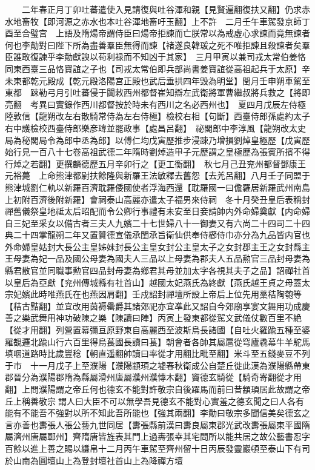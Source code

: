 　　二年春正月丁卯吐蕃遣使入見請復與吐谷渾和親【見賢遍翻復扶又翻】仍求赤水地畜牧【即河源之赤水也本吐谷渾地畜吁玉翻】上不許　二月壬午車駕發京師丁酉至合璧宫　上語及隋煬帝謂侍臣曰煬帝拒諫而亡朕常以為戒虛心求諫而竟無諫者何也李勣對曰陛下所為盡善羣臣無得而諫【禇遂良韓瑗之死不唯拒諫且殺諫者矣羣臣誰敢復諫乎李勣獻諛以苟利禄而不知凶于其家】　三月甲寅以兼司戎太常伯姜恪同東西臺三品恪寶誼之子也【司戎太常伯即兵部尚書姜寶誼從高祖起兵于太原】辛未東都乾元殿成【乾元殿洛陽宫正殿也武后垂拱四年毁為明堂】閏月壬申朔車駕至東都　踈勒弓月引吐蕃侵于闐敕西州都督崔知辯左武衛將軍曹繼叔將兵救之【將即亮翻　考異曰實錄作西川都督按於時未有西川之名必西州也】　夏四月戊辰左侍極陸敦信【龍朔改左右散騎常侍為左右侍極】檢校右相【句斷】西臺侍郎孫處約太子右中護檢校西臺侍郎樂彦瑋並罷政事【處昌呂翻】　祕閣郎中李淳風【龍朔改太史局為秘閣局令為郎中丞為郎】以傅仁均戊寅歷推步浸踈乃增損劉焯皇極歷【戊寅歷始行見一百八十七卷高祖武德二年隋時劉焯造甲子元歷謂之皇極歷為張賓所擯不得行焯之若翻】更撰麟德歷五月辛卯行之【更工衡翻】　秋七月己丑兖州都督鄧康王元裕薨　上命熊津都尉扶餘隆與新羅王法敏釋去舊怨【去羌呂翻】八月壬子同盟于熊津城劉仁軌以新羅百濟耽羅倭國使者浮海西還【耽羅國一曰儋羅居新羅武州南島上初附百濟後附新羅】會祠泰山高麗亦遣太子福男來侍祠　冬十月癸丑皇后表稱封禪舊儀祭皇地祗太后昭配而令公卿行事禮有未安至日妾請帥内外命婦奠獻【内命婦自三妃至采女以備古者三夫人九嬪二十七世婦八十一御妻又有六尚二十四司二十四典二十四掌龍朔二年又置贊德宣儀承閨承旨衛仙供奉侍櫛侍巾亦分為九品皆内官也外命婦皇姑封大長公主皇姊妹封長公主皇女封公主皇太子之女封郡主王之女封縣主王母妻為妃一品及國公母妻為國夫人三品以上母妻為郡夫人五品勲官三品封母妻為縣君散官並同職事勲官四品封母妻為鄉君其母並加太字各視其夫子之品】詔禪社首以皇后為亞獻【兖州傳城縣有社首山】越國太妃燕氏為終獻【燕氏越王貞之母蓋太宗妃嬪此時唯燕氏在也燕因肩翻】壬戍詔封禪壇所設上帝后上位先用藳秸陶匏等【秸古黠翻】並宜改用茵褥罍爵其諸郊祀亦宜凖此又詔自今郊廟享宴文舞用功成慶善之樂武舞用神功破陳之樂【陳讀曰陣】丙寅上發東都從駕文武儀仗數百里不絶【從才用翻】列營置幕彌亘原野東自高麗西至波斯烏長諸國【自吐火羅踰五種至婆羅覩邏北踰山行六百里得烏萇國長讀曰萇】朝會者各帥其屬扈從穹廬毳幕牛羊駝馬填咽道路時比歲豐稔【朝直遥翻帥讀曰率從才用翻比毗至翻】米斗至五錢麥豆不列于市　十一月戊子上至濮陽【濮陽顓頊之墟春秋衛成公自楚丘徙此漢為濮陽縣帶東郡晉分為濮陽郡隋為縣屬滑州唐屬濮州濮慱木翻】竇德玄騎從【騎奇寄翻從才用翻】上問濮陽謂之帝丘何也德玄不能對許敬宗自後躍馬而前曰昔顓頊居此故謂之帝丘上稱善敬宗謂人曰大臣不可以無學吾見德玄不能對心實羞之德玄聞之曰人各有能有不能吾不強對以所不知此吾所能也【強其兩翻】李勣曰敬宗多聞信美矣德玄之言亦善也夀張人張公藝九世同居【夀張縣前漢曰夀良屬東郡光武改夀張屬東平國隋屬濟州唐屬鄆州】齊隋唐皆旌表其門上過夀張幸其宅問所以能共居之故公藝書忍字百餘以進上善之賜以縑帛十二月丙午車駕至齊州留十日丙辰發靈巖頓至泰山下有司於山南為圓壇山上為登封壇社首山上為降禪方壇

